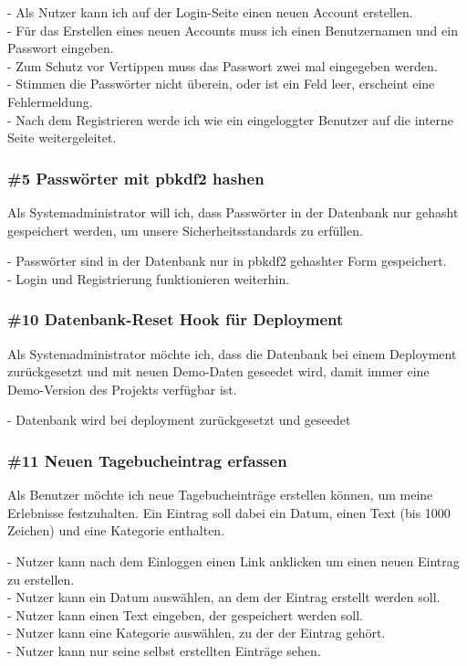 \noindent
- Als Nutzer kann ich auf der Login-Seite einen neuen Account erstellen.\\
- Für das Erstellen eines neuen Accounts muss ich einen Benutzernamen und ein Passwort eingeben.\\
- Zum Schutz vor Vertippen muss das Passwort zwei mal eingegeben werden.\\
- Stimmen die Passwörter nicht überein, oder ist ein Feld leer, erscheint eine Fehlermeldung.\\
- Nach dem Registrieren werde ich wie ein eingeloggter Benutzer auf die interne Seite weitergeleitet.


\subsubsection*{\#5 Passwörter mit pbkdf2 hashen}
Als Systemadministrator will ich, dass Passwörter in der Datenbank nur gehasht gespeichert werden, um unsere Sicherheitsstandards zu erfüllen.

\noindent
- Passwörter sind in der Datenbank nur in pbkdf2 gehashter Form gespeichert.\\
- Login und Registrierung funktionieren weiterhin.


\subsubsection*{\#10 Datenbank-Reset Hook für Deployment}
Als Systemadministrator möchte ich, dass die Datenbank bei einem Deployment zurückgesetzt und mit neuen Demo-Daten geseedet wird, damit immer eine Demo-Version des Projekts verfügbar ist.

\noindent
- Datenbank wird bei deployment zurückgesetzt und geseedet


\subsubsection*{\#11 Neuen Tagebucheintrag erfassen}
Als Benutzer möchte ich neue Tagebucheinträge erstellen können, um meine Erlebnisse festzuhalten. Ein Eintrag soll dabei ein Datum, einen Text (bis 1000 Zeichen) und eine Kategorie enthalten.

\noindent
- Nutzer kann nach dem Einloggen einen Link anklicken um einen neuen Eintrag zu erstellen.\\
- Nutzer kann ein Datum auswählen, an dem der Eintrag erstellt werden soll.\\
- Nutzer kann einen Text eingeben, der gespeichert werden soll.\\
- Nutzer kann eine Kategorie auswählen, zu der der Eintrag gehört.\\
- Nutzer kann nur seine selbst erstellten Einträge sehen.


